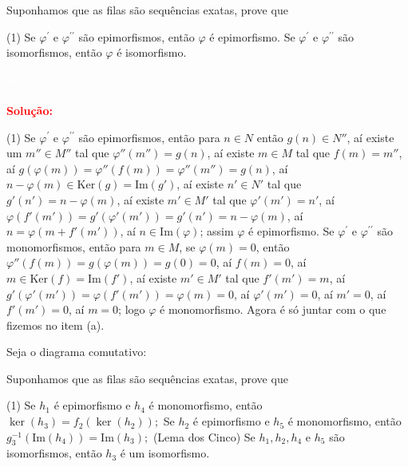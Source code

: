 \documentclass[11pt,a4paper]{article}
\newcounter{exercicio}[section]
\newcommand{\dividiritens}[1]{\begin{tasks}[counter-format={(tsk[a])},label-width=3.6ex, label-format = {\bfseries}, column-sep = {0pt}](1) #1 \end{tasks}}
\newcommand{\pers}[1]{\textcolor{Floresta}{$\negrito{(#1)} $}}
\newcommand{\solucao}[1]{
\textbf{\textcolor{white}{oi}\\ \\ \textcolor{red}{Solução:}} #1}
\begin{document}
Suponhamos que as filas são sequências exatas, prove que
\dividiritens{
\task[\pers{a}] Se $\varphi^\prime$ e $\varphi^{\prime \prime}$ são epimorfismos, então $\varphi$ é epimorfismo.
\task[\pers{b}] Se $\varphi^\prime$ e $\varphi^{\prime \prime}$ são isomorfismos, então $\varphi$ é isomorfismo.
}
\solucao{
\dividiritens{
\task[\pers{a}] Se $\varphi^\prime$ e $\varphi^{\prime \prime}$ são epimorfismos, então para $n\in N$ então $g(n)\in N''$, aí existe um $m''\in M''$ tal que $\varphi''(m'')=g(n)$, aí existe $m\in M$ tal que $f(m)=m''$, aí $g(\varphi(m))=\varphi''(f(m))=\varphi''(m'')=g(n)$, aí $n-\varphi(m)\in\mathrm{Ker}(g)=\mathrm{Im}(g')$, aí existe $n'\in N'$ tal que $g'(n')=n-\varphi(m)$, aí existe $m'\in M'$ tal que $\varphi'(m')=n'$, aí $\varphi(f'(m'))=g'(\varphi'(m'))=g'(n')=n-\varphi(m)$, aí $n=\varphi(m+f'(m'))$, aí $n\in\mathrm{Im}(\varphi)$; assim $\varphi$ é epimorfismo.
\task[\pers{b}] Se $\varphi^\prime$ e $\varphi^{\prime \prime}$ são monomorfismos, então para $m\in M$, se $\varphi(m)=0$, então $\varphi''(f(m))=g(\varphi(m))=g(0)=0$, aí $f(m)=0$, aí $m\in\mathrm{Ker}(f)=\mathrm{Im}(f')$, aí existe $m'\in M'$ tal que $f'(m')=m$, aí $g'(\varphi'(m'))=\varphi(f'(m'))=\varphi(m)=0$, aí $\varphi'(m')=0$, aí $m'=0$, aí $f'(m')=0$, aí $m=0$; logo $\varphi$ é monomorfismo. Agora é só juntar com o que fizemos no item (a).
}
}
 Seja o diagrama comutativo:
\begin{center}
\end{center}
Suponhamos que as filas são sequências exatas, prove que
\dividiritens{
\task[\pers{a}] Se $h_1$ é epimorfismo e $h_4$ é monomorfismo, então $\ker(h_3) = f_2(\ker(h_2));$
\task[\pers{b}] Se $h_2$ é epimorfismo e $h_5$ é monomorfismo, então $g_3^{-1}(\mbox{Im}(h_4)) = \mbox{Im}(h_3);$
\task[\pers{c}] (Lema dos Cinco) Se $h_1, h_2, h_4$ e $h_5$ são isomorfismos, então $h_3$ é um isomorfismo.
}
\end{document}
